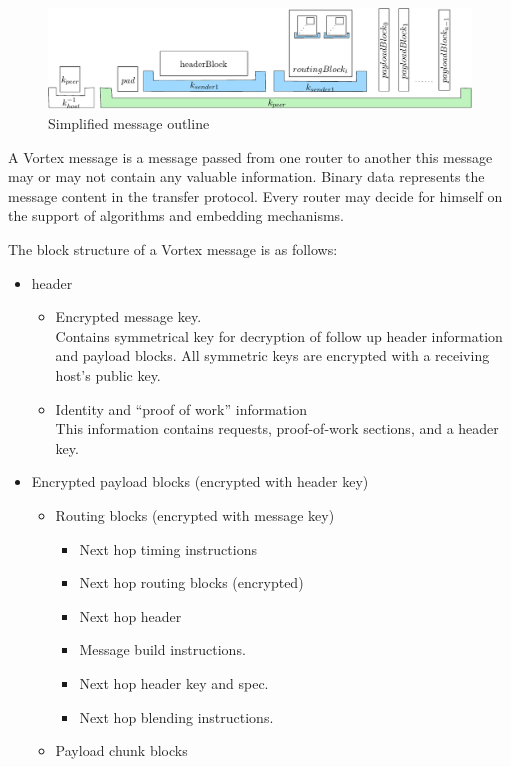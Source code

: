 \begin{figure}[ht]
	\includegraphics[width=\textwidth]{inc/blockLayoutSimplified}
	\caption{Simplified message outline}
    \label{fig:messageOutline}
\end{figure}

A Vortex message is a message passed from one router to another this message may or may not contain any valuable information. Binary data represents the message content in the transfer protocol. Every router may decide for himself on the support of algorithms and embedding mechanisms.

The block structure of a Vortex message is as follows:
\begin{itemize}
	\item header
	\begin{itemize}
		\item Encrypted message key.\\
			  Contains symmetrical key for decryption of follow up header information and payload blocks. All symmetric keys are encrypted with a receiving host's public key.
		\item Identity and ``proof of work'' information\\
		      This information contains requests, proof-of-work sections, and a header key.
	\end{itemize}
	\item Encrypted payload blocks (encrypted with header key)
	\begin{itemize}
		\item Routing blocks (encrypted with message key)
		\begin{itemize}
			\item Next hop timing instructions
			\item Next hop routing blocks (encrypted)
			\item Next hop header
			\item Message build instructions.
			\item Next hop header key and spec.
			\item Next hop blending instructions.
		\end{itemize}
		\item Payload chunk blocks
	\end{itemize}
\end{itemize}

